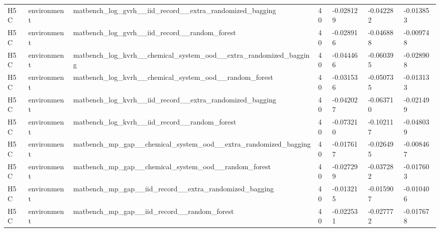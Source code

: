 \documentclass[10pt]{article}
\begin{document}
\begin{landscape}
\begin{longtable}{L{.35in}L{.6in}L{3.55in}L{.4in}L{.88in}L{.88in}L{.88in}}
H5C & environment & matbench\_\allowbreak{}log\_\allowbreak{}gvrh\_\allowbreak{}\_\allowbreak{}iid\_\allowbreak{}record\_\allowbreak{}\_\allowbreak{}extra\_\allowbreak{}randomized\_\allowbreak{}bagging & 40 & -0.028129 & -0.042282 & -0.013853\\
H5C & environment & matbench\_\allowbreak{}log\_\allowbreak{}gvrh\_\allowbreak{}\_\allowbreak{}iid\_\allowbreak{}record\_\allowbreak{}\_\allowbreak{}random\_\allowbreak{}forest & 40 & -0.028916 & -0.046888 & -0.009748\\
H5C & environment & matbench\_\allowbreak{}log\_\allowbreak{}kvrh\_\allowbreak{}\_\allowbreak{}chemical\_\allowbreak{}system\_\allowbreak{}ood\_\allowbreak{}\_\allowbreak{}extra\_\allowbreak{}randomized\_\allowbreak{}bagging & 40 & -0.044466 & -0.060395 & -0.028908\\
H5C & environment & matbench\_\allowbreak{}log\_\allowbreak{}kvrh\_\allowbreak{}\_\allowbreak{}chemical\_\allowbreak{}system\_\allowbreak{}ood\_\allowbreak{}\_\allowbreak{}random\_\allowbreak{}forest & 40 & -0.031536 & -0.050735 & -0.013133\\
H5C & environment & matbench\_\allowbreak{}log\_\allowbreak{}kvrh\_\allowbreak{}\_\allowbreak{}iid\_\allowbreak{}record\_\allowbreak{}\_\allowbreak{}extra\_\allowbreak{}randomized\_\allowbreak{}bagging & 40 & -0.042027 & -0.063710 & -0.021499\\
H5C & environment & matbench\_\allowbreak{}log\_\allowbreak{}kvrh\_\allowbreak{}\_\allowbreak{}iid\_\allowbreak{}record\_\allowbreak{}\_\allowbreak{}random\_\allowbreak{}forest & 40 & -0.073210 & -0.102117 & -0.048039\\
H5C & environment & matbench\_\allowbreak{}mp\_\allowbreak{}gap\_\allowbreak{}\_\allowbreak{}chemical\_\allowbreak{}system\_\allowbreak{}ood\_\allowbreak{}\_\allowbreak{}extra\_\allowbreak{}randomized\_\allowbreak{}bagging & 40 & -0.017617 & -0.026495 & -0.008467\\
H5C & environment & matbench\_\allowbreak{}mp\_\allowbreak{}gap\_\allowbreak{}\_\allowbreak{}chemical\_\allowbreak{}system\_\allowbreak{}ood\_\allowbreak{}\_\allowbreak{}random\_\allowbreak{}forest & 40 & -0.027299 & -0.037282 & -0.017603\\
H5C & environment & matbench\_\allowbreak{}mp\_\allowbreak{}gap\_\allowbreak{}\_\allowbreak{}iid\_\allowbreak{}record\_\allowbreak{}\_\allowbreak{}extra\_\allowbreak{}randomized\_\allowbreak{}bagging & 40 & -0.013215 & -0.015907 & -0.010406\\
H5C & environment & matbench\_\allowbreak{}mp\_\allowbreak{}gap\_\allowbreak{}\_\allowbreak{}iid\_\allowbreak{}record\_\allowbreak{}\_\allowbreak{}random\_\allowbreak{}forest & 40 & -0.022531 & -0.027772 & -0.017678\\

\end{longtable}
\end{landscape}
\end{document}
